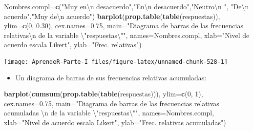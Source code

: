 \documentclass[]{book}
\newenvironment{Shaded}{\begin{snugshade}}{\end{snugshade}}
\newcommand{\CharTok}[1]{\textcolor[rgb]{0.31,0.60,0.02}{#1}}
\newcommand{\DataTypeTok}[1]{\textcolor[rgb]{0.13,0.29,0.53}{#1}}
\newcommand{\DecValTok}[1]{\textcolor[rgb]{0.00,0.00,0.81}{#1}}
\newcommand{\FloatTok}[1]{\textcolor[rgb]{0.00,0.00,0.81}{#1}}
\newcommand{\KeywordTok}[1]{\textcolor[rgb]{0.13,0.29,0.53}{\textbf{#1}}}
\newcommand{\NormalTok}[1]{#1}
\newcommand{\StringTok}[1]{\textcolor[rgb]{0.31,0.60,0.02}{#1}}
\providecommand{\tightlist}{%
  \setlength{\itemsep}{0pt}\setlength{\parskip}{0pt}}
\theoremstyle{definition}
\theoremstyle{definition}
\theoremstyle{definition}
\theoremstyle{remark}
\begin{document}
\begin{Shaded}
\begin{Highlighting}[]
\NormalTok{Nombres.compl=}\KeywordTok{c}\NormalTok{(}\StringTok{"Muy en}\CharTok{\textbackslash{}n}\StringTok{ desacuerdo"}\NormalTok{,}\StringTok{"En}\CharTok{\textbackslash{}n}\StringTok{ desacuerdo"}\NormalTok{,}\StringTok{"Neutro}\CharTok{\textbackslash{}n}\StringTok{ "}\NormalTok{,}
                \StringTok{"De}\CharTok{\textbackslash{}n}\StringTok{ acuerdo"}\NormalTok{,}\StringTok{"Muy de}\CharTok{\textbackslash{}n}\StringTok{ acuerdo"}\NormalTok{)}
\KeywordTok{barplot}\NormalTok{(}\KeywordTok{prop.table}\NormalTok{(}\KeywordTok{table}\NormalTok{(respuestas)), }\DataTypeTok{ylim=}\KeywordTok{c}\NormalTok{(}\DecValTok{0}\NormalTok{, }\FloatTok{0.30}\NormalTok{), }\DataTypeTok{cex.names=}\FloatTok{0.75}\NormalTok{,}
  \DataTypeTok{main=}\StringTok{"Diagrama de barras de las frecuencias relativas}\CharTok{\textbackslash{}n}\StringTok{ de la variable }\CharTok{\textbackslash{}"}\StringTok{respuestas}\CharTok{\textbackslash{}"}\StringTok{"}\NormalTok{, }
  \DataTypeTok{names=}\NormalTok{Nombres.compl, }\DataTypeTok{xlab=}\StringTok{"Nivel de acuerdo escala Likert"}\NormalTok{,  }\DataTypeTok{ylab=}\StringTok{"Frec. relativas"}\NormalTok{)}
\end{Highlighting}
\end{Shaded}

\begin{center}\texttt{[image: AprendeR-Parte-I\_files/figure-latex/unnamed-chunk-528-1]} \end{center}

\begin{itemize}
\tightlist
\item
  Un diagrama de barras de sus frecuencias relativas acumuladas:
\end{itemize}

\begin{Shaded}
\begin{Highlighting}[]
\KeywordTok{barplot}\NormalTok{(}\KeywordTok{cumsum}\NormalTok{(}\KeywordTok{prop.table}\NormalTok{(}\KeywordTok{table}\NormalTok{(respuestas))), }\DataTypeTok{ylim=}\KeywordTok{c}\NormalTok{(}\DecValTok{0}\NormalTok{, }\DecValTok{1}\NormalTok{), }\DataTypeTok{cex.names=}\FloatTok{0.75}\NormalTok{,}
  \DataTypeTok{main=}\StringTok{"Diagrama de barras de las frecuencias relativas acumuladas }\CharTok{\textbackslash{}n}\StringTok{ de la variable }\CharTok{\textbackslash{}"}\StringTok{respuestas}\CharTok{\textbackslash{}"}\StringTok{"}\NormalTok{, }
  \DataTypeTok{names=}\NormalTok{Nombres.compl, }\DataTypeTok{xlab=}\StringTok{"Nivel de acuerdo escala Likert"}\NormalTok{, }\DataTypeTok{ylab=}\StringTok{"Frec. relativas acumuladas"}\NormalTok{)}
\end{Highlighting}
\end{Shaded}
\end{document}
